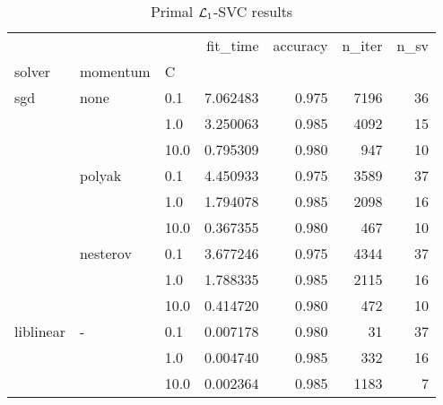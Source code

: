 \begin{table}[H]
\centering
\caption{Primal $\protect \mathcal{L}_1$-SVC results}
\label{primal_l1_svc_cv_results}
\begin{tabular}{lllrrrr}
\toprule
          &   &      &  fit\_time &  accuracy &  n\_iter &  n\_sv \\
solver & momentum & C &           &           &         &       \\
\midrule
sgd & none & 0.1  &  7.062483 &     0.975 &    7196 &    36 \\
          &   & 1.0  &  3.250063 &     0.985 &    4092 &    15 \\
          &   & 10.0 &  0.795309 &     0.980 &     947 &    10 \\
          & polyak & 0.1  &  4.450933 &     0.975 &    3589 &    37 \\
          &   & 1.0  &  1.794078 &     0.985 &    2098 &    16 \\
          &   & 10.0 &  0.367355 &     0.980 &     467 &    10 \\
          & nesterov & 0.1  &  3.677246 &     0.975 &    4344 &    37 \\
          &   & 1.0  &  1.788335 &     0.985 &    2115 &    16 \\
          &   & 10.0 &  0.414720 &     0.980 &     472 &    10 \\
liblinear & - & 0.1  &  0.007178 &     0.980 &      31 &    37 \\
          &   & 1.0  &  0.004740 &     0.985 &     332 &    16 \\
          &   & 10.0 &  0.002364 &     0.985 &    1183 &     7 \\
\bottomrule
\end{tabular}
\end{table}
